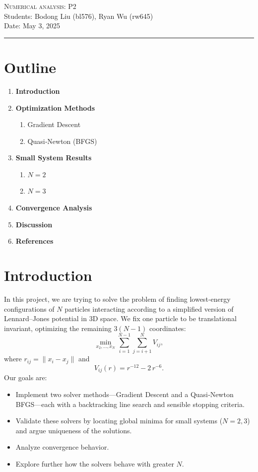 \documentclass[11pt,onecolumn]{article}
\begin{document}
\noindent
\textsc{\Large Numerical analysis: P2}\\
Students: Bodong Liu (bl576), Ryan Wu (rw645)\\
Date: May 3, 2025
\begin{center}\rule{1\linewidth}{0.5pt}\end{center}
\section*{Outline}
\begin{enumerate}
  \item \textbf{Introduction}

  \item \textbf{Optimization Methods}
    \begin{enumerate}
      \item Gradient Descent
      \item Quasi‑Newton (BFGS)
    \end{enumerate}

  \item \textbf{Small System Results}
    \begin{enumerate}
      \item $N=2$
      \item $N=3$
    \end{enumerate}
  
  \item \textbf{Convergence Analysis}

  \item \textbf{Discussion}

  \item \textbf{References}
\end{enumerate}

\newpage

\section{Introduction}
In this project, we are trying to solve the problem of finding lowest‐energy configurations of $N$ particles interacting according to a simplified version of Lennard–Jones potential in 3D space. We fix one particle to be translational invariant, optimizing the remaining $3(N-1)$ coordinates:
\[
  \min_{x_2,\ldots,x_N} \sum_{i=1}^{N-1}\sum_{j=i+1}^{N} V_{ij},
\]
where $r_{ij}=\|x_i - x_j\|$ and
\[
  V_{ij}(r) = r^{-12} - 2\,r^{-6}.
\]
Our goals are:
\begin{itemize}
  \item Implement two solver methods—Gradient Descent and a Quasi‑Newton BFGS—each with a backtracking line search and sensible stopping criteria.
  \item Validate these solvers by locating global minima for small systems ($N=2,3$) and argue uniqueness of the solutions.
  \item Analyze convergence behavior.
  \item Explore further how the solvers behave with greater $N$.
\end{itemize}
\end{document}
